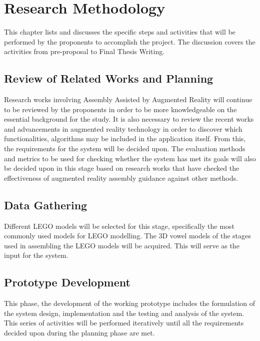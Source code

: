 %
%
%                 

\chapter{Research Methodology}
This chapter lists and discusses the specific steps and activities that will be performed by the proponents to accomplish the project. The discussion covers the activities from pre-proposal to Final Thesis Writing.

\section{Review of Related Works and Planning}
Research works involving Assembly Assisted by Augmented Reality will continue to be reviewed by the proponents in order to be more knowledgeable on the essential background for the study. It is also necessary to review the recent works and advancements in augmented reality technology in order to discover which functionalities, algorithms may be included in the application itself. From this, the requirements for the system will be decided upon. The evaluation methods and metrics to be used for checking whether the system has met its goals will also be decided upon in this stage based on research works that have checked the effectiveness of augmented reality assembly guidance against other methods.

\section{Data Gathering}
Different LEGO models will be selected for this stage, specifically the most commonly used models for LEGO modelling. The 3D vowel models of the stages used in assembling the LEGO models will be acquired. This will serve as the input for the system.

\section{Prototype Development}
This phase, the development of the working prototype includes the formulation of the system design, implementation and the testing and analysis of the system. This series of activities will be performed iteratively until all the requirements decided upon during the planning phase are met.

